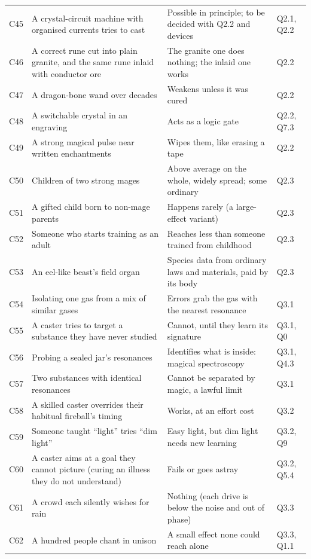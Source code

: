 \begin{longtable}{@{}>{\raggedright\arraybackslash}p{}>{\raggedright\arraybackslash}p{}>{\raggedright\arraybackslash}p{}>{\raggedright\arraybackslash}p{}@{}}
C45 & A crystal-circuit machine with organised currents tries to cast & Possible in principle; to be decided with Q2.2 and devices & Q2.1, Q2.2\\
C46 & A correct rune cut into plain granite, and the same rune inlaid with conductor ore & The granite one does nothing; the inlaid one works & Q2.2\\
C47 & A dragon-bone wand over decades & Weakens unless it was cured & Q2.2\\
C48 & A switchable crystal in an engraving & Acts as a logic gate & Q2.2, Q7.3\\
C49 & A strong magical pulse near written enchantments & Wipes them, like erasing a tape & Q2.2\\
C50 & Children of two strong mages & Above average on the whole, widely spread; some ordinary & Q2.3\\
C51 & A gifted child born to non-mage parents & Happens rarely (a large-effect variant) & Q2.3\\
C52 & Someone who starts training as an adult & Reaches less than someone trained from childhood & Q2.3\\
C53 & An eel-like beast's field organ & Species data from ordinary laws and materials, paid by its body & Q2.3\\
C54 & Isolating one gas from a mix of similar gases & Errors grab the gas with the nearest resonance & Q3.1\\
C55 & A caster tries to target a substance they have never studied & Cannot, until they learn its signature & Q3.1, Q0\\
C56 & Probing a sealed jar's resonances & Identifies what is inside: magical spectroscopy & Q3.1, Q4.3\\
C57 & Two substances with identical resonances & Cannot be separated by magic, a lawful limit & Q3.1\\
C58 & A skilled caster overrides their habitual fireball's timing & Works, at an effort cost & Q3.2\\
C59 & Someone taught ``light'' tries ``dim light'' & Easy light, but dim light needs new learning & Q3.2, Q9\\
C60 & A caster aims at a goal they cannot picture (curing an illness they do not understand) & Fails or goes astray & Q3.2, Q5.4\\
C61 & A crowd each silently wishes for rain & Nothing (each drive is below the noise and out of phase) & Q3.3\\
C62 & A hundred people chant in unison & A small effect none could reach alone & Q3.3, Q1.1\\

\end{longtable}
